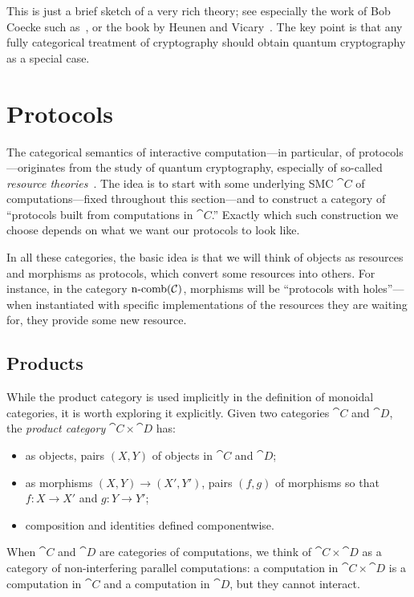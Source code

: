 This is just a brief sketch of a very rich theory; see especially the work of
Bob Coecke such
as~\cite{abramsky-coecke-2004,coecke-perdrix-2012,coecke-kissinger-2017}, or the
book by Heunen and Vicary~\cite{heunen-vicary-2014}. The key point is that any
fully categorical treatment of cryptography should obtain quantum cryptography as
a special case.

\section{Protocols}
\label{sec:protocols}

The categorical semantics of interactive computation---in particular, of
protocols---originates from the study of quantum cryptography, especially of
so-called \emph{resource theories}~\cite{coecke-2016}. The idea is to start with
some underlying SMC $\cat{C}$ of computations---fixed throughout this
section---and to construct a category of ``protocols built from computations in
$\cat{C}$.'' Exactly which such construction we choose depends on what we want
our protocols to look like.

In all these categories, the basic idea is that we will think of objects as
resources and morphisms as protocols, which convert some resources into others.
For instance, in the category $\operatorname*{n-comb}({\mathcal{C}})$, morphisms will be ``protocols with
holes''---when instantiated with specific implementations of the resources they
are waiting for, they provide some new resource.

\subsection{Products}

While the product category is used implicitly in the definition of monoidal
categories, it is worth exploring it explicitly. Given two categories $\cat{C}$
and $\cat{D}$, the \emph{product category} $\cat{C}\times\cat{D}$ has:
\begin{itemize}
  \item as objects, pairs $(X,Y)$ of objects in $\cat{C}$ and $\cat{D}$;
  \item as morphisms $(X,Y)\to (X',Y')$, pairs $(f,g)$ of morphisms so that $f:
    X\to X'$ and $g: Y\to Y'$;
  \item composition and identities defined componentwise.
\end{itemize}

When $\cat{C}$ and $\cat{D}$ are categories of computations, we think of
$\cat{C}\times\cat{D}$ as a category of non-interfering parallel computations: a
computation in $\cat{C}\times\cat{D}$ is a computation in $\cat{C}$ and a
computation in $\cat{D}$, but they cannot interact.

